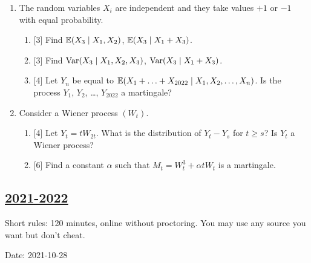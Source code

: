 \begin{enumerate}
  
  \item The random variables $X_i$ are independent and they take values $+1$ or $-1$ with equal probability. 
  
  \begin{enumerate}
  \item {[3]} Find $\operatorname{\mathbb{E}}(X_3 \mid X_1, X_2)$, $\operatorname{\mathbb{E}}(X_3 \mid X_1 + X_3)$.
  \item {[3]} Find $\operatorname{Var}(X_3 \mid X_1, X_2, X_3)$, $\operatorname{Var}(X_3 \mid X_1 + X_3)$.
  \item {[4]} Let $Y_n$ be equal to $\operatorname{\mathbb{E}}(X_1 + \ldots +  X_{2022} \mid X_1, X_2, \ldots, X_n)$. \newline
  Is the process $Y_1$, $Y_2$, \ldots, $Y_{2022}$ a martingale?
  \end{enumerate}
  
  
  \item Consider a Wiener process $(W_t)$.
  \begin{enumerate}
      \item {[4]} Let $Y_t = t W_{2t}$. What is the distribution of $Y_t - Y_s$ for $t\geq s$? Is $Y_t$ a Wiener process?
      \item {[6]} Find a constant $\alpha$ such that $M_t = W_t^3 + \alpha t W_t$ is a martingale. 
  \end{enumerate}
  
  
  
  \end{enumerate}
  



\subsection[2021-2022]{\hyperref[sec:sol_kr_01_2021_2022]{2021-2022}}
\label{sec:kr_01_2021_2022} %

Short rules: 120 minutes, online without proctoring. You may use any source you want but don't cheat.

Date: 2021-10-28

